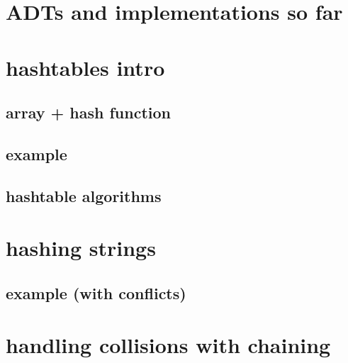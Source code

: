 
\begin{frame}
    \titlepage
\end{frame}

\section{ADTs and implementations so far}



\section{hashtables intro}

\subsection{array + hash function}







%

\subsection{example}


\subsection{hashtable algorithms}


\section{hashing strings}





\subsection{example (with conflicts)}


\section{handling collisions with chaining}

